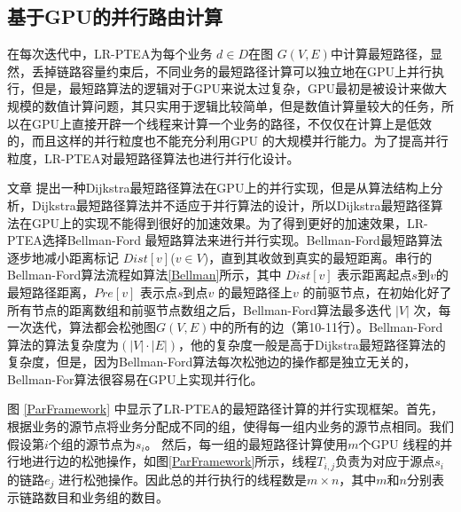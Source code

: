 \subsection{基于GPU的并行路由计算}
在每次迭代中，LR-PTEA为每个业务 $d \in D$在图 $G(V, E)$中计算最短路径，显然，丢掉链路容量约束后，不同业务的最短路径计算可以独立地在GPU上并行执行，但是，最短路算法的逻辑对于GPU来说太过复杂，GPU最初是被设计来做大规模的数值计算问题，其只实用于逻辑比较简单，但是数值计算量较大的任务，所以在GPU上直接开辟一个线程来计算一个业务的路径，不仅仅在计算上是低效的，而且这样的并行粒度也不能充分利用GPU 的大规模并行能力。为了提高并行粒度，LR-PTEA对最短路径算法也进行并行化设计。

文章 提出一种Dijkstra最短路径算法在GPU上的并行实现，但是从算法结构上分析，Dijkstra最短路径算法并不适应于并行算法的设计，所以Dijkstra最短路径算法在GPU上的实现不能得到很好的加速效果。为了得到更好的加速效果，LR-PTEA选择Bellman-Ford 最短路算法来进行并行实现。Bellman-Ford最短路算法逐步地减小距离标记 $Dist[v]$($v\in V$)，直到其收敛到真实的最短距离。串行的Bellman-Ford算法流程如算法\ref{Bellman}所示，其中 $Dist[v]$ 表示距离起点$s$到$v$的最短路径距离，$Pre[v]$ 表示点$s$到点$v$ 的最短路径上$v$ 的前驱节点，在初始化好了所有节点的距离数组和前驱节点数组之后，Bellman-Ford算法最多迭代 $|V|$ 次，每一次迭代，算法都会松弛图$G(V, E)$中的所有的边（第10-11行）。Bellman-Ford 算法的算法复杂度为$(|V|\cdot |E|)$，他的复杂度一般是高于Dijkstra最短路径算法的复杂度，但是，因为Bellman-Ford算法每次松弛边的操作都是独立无关的，Bellman-For算法很容易在GPU上实现并行化。

图 \ref{ParFramework} 中显示了LR-PTEA的最短路径计算的并行实现框架。首先，根据业务的源节点将业务分配成不同的组，使得每一组内业务的源节点相同。我们假设第$i$个组的源节点为$s_i$。 然后，每一组的最短路径计算使用$m$个GPU 线程的并行地进行边的松弛操作，如图\ref{ParFramework}所示，线程$T_{i,j}$负责为对应于源点$s_i$的链路$e_{j}$ 进行松弛操作。因此总的并行执行的线程数是$m \times n$，其中$m$和$n$分别表示链路数目和业务组的数目。

